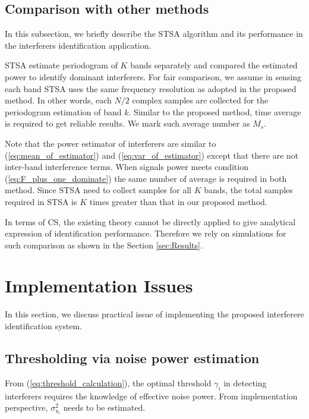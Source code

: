 \documentclass{IEEEtran}
\begin{document}
\subsection{Comparison with other methods}
In this subsection, we briefly describe the STSA algorithm and its performance in the interferers identification application. 

STSA estimate periodogram of $K$ bands separately and compared the estimated power to identify dominant interferers. For fair comparison, we assume in sensing each band STSA uses the same frequency resolution as adopted in the proposed method. In other words, each $N/2$ complex samples are collected for the periodogram estimation of band $k$. Similar to the proposed method, time average is required to get reliable results. We mark such average number as $M_s$. 

Note that the power estimator of interferers are similar to (\ref{eq:mean_of_estimator}) and (\ref{eq:var_of_estimator}) except that there are not inter-band interference terms. When signals power meets condition (\ref{eq:F_plus_one_dominate}) the same number of average is required in both method. Since STSA need to collect samples for all $K$ bands, the total samples required in STSA is $K$ times greater than that in our proposed method.

In terms of CS, the existing theory cannot be directly applied to give analytical expression of identification performance. Therefore we rely on simulations for such comparison as shown in the Section \ref{sec:Results}.

%
%
\section{Implementation Issues}
In this section, we discuss practical issue of implementing the proposed interferere identification system.

\subsection{Thresholding via noise power estimation}
From (\ref{eq:threshold_calculation}), the optimal threshold $\gamma_i$ in detecting interferers requires the knowledge of effective noise power. From implementation perspective, $\sigma^2_{\mathtt{v}_i}$ needs to be estimated. 
\end{document}
